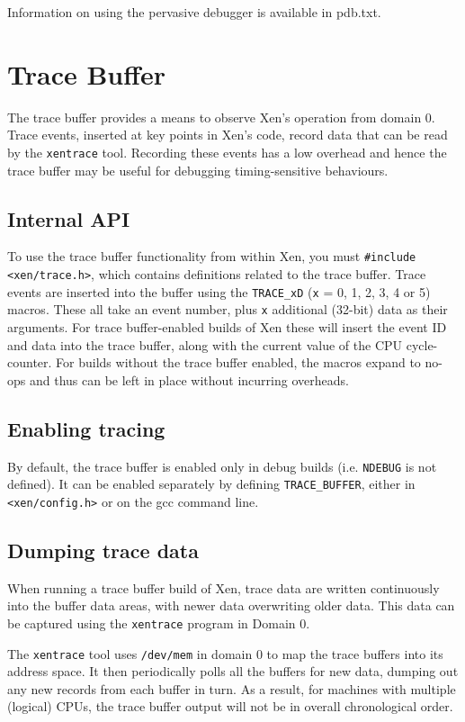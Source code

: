 \documentclass[11pt,twoside,final,openright]{xenstyle}
\begin{document}
Information on using the pervasive debugger is available in pdb.txt.


\section{Trace Buffer}

The trace buffer provides a means to observe Xen's operation from domain 0.
Trace events, inserted at key points in Xen's code, record data that can be
read by the {\tt xentrace} tool.  Recording these events has a low overhead
and hence the trace buffer may be useful for debugging timing-sensitive
behaviours.

\subsection{Internal API}

To use the trace buffer functionality from within Xen, you must {\tt \#include
<xen/trace.h>}, which contains definitions related to the trace buffer.  Trace
events are inserted into the buffer using the {\tt TRACE\_xD} ({\tt x} = 0, 1,
2, 3, 4 or 5) macros.  These all take an event number, plus {\tt x} additional
(32-bit) data as their arguments.  For trace buffer-enabled builds of Xen these
will insert the event ID and data into the trace buffer, along with the current
value of the CPU cycle-counter.  For builds without the trace buffer enabled,
the macros expand to no-ops and thus can be left in place without incurring
overheads.

\subsection{Enabling tracing}

By default, the trace buffer is enabled only in debug builds (i.e. {\tt NDEBUG}
is not defined).  It can be enabled separately by defining {\tt TRACE\_BUFFER},
either in {\tt <xen/config.h>} or on the gcc command line.

\subsection{Dumping trace data}

When running a trace buffer build of Xen, trace data are written continuously
into the buffer data areas, with newer data overwriting older data.  This data
can be captured using the {\tt xentrace} program in Domain 0.

The {\tt xentrace} tool uses {\tt /dev/mem} in domain 0 to map the trace
buffers into its address space.  It then periodically polls all the buffers for
new data, dumping out any new records from each buffer in turn.  As a result,
for machines with multiple (logical) CPUs, the trace buffer output will not be
in overall chronological order.
\end{document}
